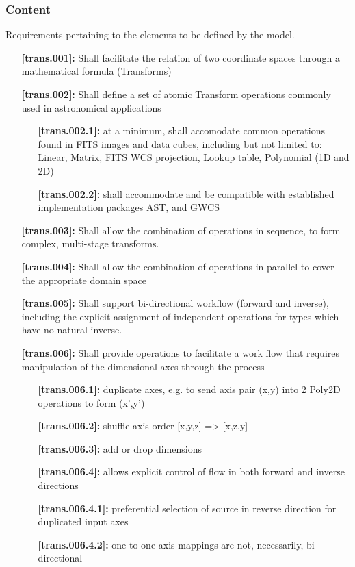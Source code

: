 \documentclass[11pt,a4paper]{ivoa}
\begin{document}
\subsubsection{Content}
Requirements pertaining to the elements to be defined by the model.
\begin{itemize}

  \item [\textbf{[trans.001]:}] Shall facilitate the relation of two coordinate spaces through a mathematical formula (Transforms)
  \item [\textbf{[trans.002]:}] Shall define a set of atomic Transform operations commonly used in astronomical applications
  \begin{itemize}
    \item [\textbf{[trans.002.1]:}] at a minimum, shall accomodate common operations found in FITS images and data cubes, including but not limited to:
                 Linear, Matrix, FITS WCS projection, Lookup table, Polynomial (1D and 2D) 
    \item [\textbf{[trans.002.2]:}] shall accommodate and be compatible with established implementation packages AST, and GWCS 
  \end{itemize}
  \item [\textbf{[trans.003]:}] Shall allow the combination of operations in sequence, to form complex, multi-stage transforms.
  \item [\textbf{[trans.004]:}] Shall allow the combination of operations in parallel to cover the appropriate domain space
  \item [\textbf{[trans.005]:}] Shall support bi-directional workflow (forward and inverse), including the explicit assignment of independent operations for types which have no natural inverse.
  \item [\textbf{[trans.006]:}] Shall provide operations to facilitate a work flow that requires manipulation of the dimensional axes through the process
  \begin{itemize}
    \item [\textbf{[trans.006.1]:}] duplicate axes, e.g. to send axis pair (x,y) into 2 Poly2D operations to form (x',y')
    \item [\textbf{[trans.006.2]:}] shuffle axis order [x,y,z] => [x,z,y]
    \item [\textbf{[trans.006.3]:}] add or drop dimensions 
    \item [\textbf{[trans.006.4]:}] allows explicit control of flow in both forward and inverse directions
    \item [\textbf{[trans.006.4.1]:}] preferential selection of source in reverse direction for duplicated input axes
    \item [\textbf{[trans.006.4.2]:}] one-to-one axis mappings are not, necessarily, bi-directional
  \end{itemize}
\end{itemize}
\end{document}
